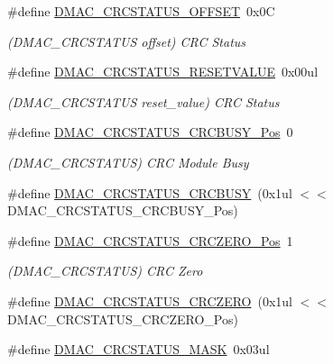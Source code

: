 \begin{DoxyCompactItemize}
\#define \mbox{\hyperlink{group___s_a_m_d21___d_m_a_c_gab05e9410749f64351e0e0e5428cbd63e}{D\+M\+A\+C\+\_\+\+C\+R\+C\+S\+T\+A\+T\+U\+S\+\_\+\+O\+F\+F\+S\+ET}}~0x0C
\begin{DoxyCompactList}\small\item\em (D\+M\+A\+C\+\_\+\+C\+R\+C\+S\+T\+A\+T\+US offset) C\+RC Status \end{DoxyCompactList}\item 
\#define \mbox{\hyperlink{group___s_a_m_d21___d_m_a_c_gaa0c9009f518f6ae4a37ebe42ffc30007}{D\+M\+A\+C\+\_\+\+C\+R\+C\+S\+T\+A\+T\+U\+S\+\_\+\+R\+E\+S\+E\+T\+V\+A\+L\+UE}}~0x00ul
\begin{DoxyCompactList}\small\item\em (D\+M\+A\+C\+\_\+\+C\+R\+C\+S\+T\+A\+T\+US reset\+\_\+value) C\+RC Status \end{DoxyCompactList}\item 
\#define \mbox{\hyperlink{group___s_a_m_d21___d_m_a_c_gae6bb7fca62508d8dd9b0b0ad51ca6503}{D\+M\+A\+C\+\_\+\+C\+R\+C\+S\+T\+A\+T\+U\+S\+\_\+\+C\+R\+C\+B\+U\+S\+Y\+\_\+\+Pos}}~0
\begin{DoxyCompactList}\small\item\em (D\+M\+A\+C\+\_\+\+C\+R\+C\+S\+T\+A\+T\+US) C\+RC Module Busy \end{DoxyCompactList}\item 
\#define \mbox{\hyperlink{group___s_a_m_d21___d_m_a_c_gaf93b4ba437e8219c5b5ee859e20607ed}{D\+M\+A\+C\+\_\+\+C\+R\+C\+S\+T\+A\+T\+U\+S\+\_\+\+C\+R\+C\+B\+U\+SY}}~(0x1ul $<$$<$ D\+M\+A\+C\+\_\+\+C\+R\+C\+S\+T\+A\+T\+U\+S\+\_\+\+C\+R\+C\+B\+U\+S\+Y\+\_\+\+Pos)
\item 
\#define \mbox{\hyperlink{group___s_a_m_d21___d_m_a_c_ga82828623d891f8488dd3afc780ec46fd}{D\+M\+A\+C\+\_\+\+C\+R\+C\+S\+T\+A\+T\+U\+S\+\_\+\+C\+R\+C\+Z\+E\+R\+O\+\_\+\+Pos}}~1
\begin{DoxyCompactList}\small\item\em (D\+M\+A\+C\+\_\+\+C\+R\+C\+S\+T\+A\+T\+US) C\+RC Zero \end{DoxyCompactList}\item 
\#define \mbox{\hyperlink{group___s_a_m_d21___d_m_a_c_gabcda07f7f0242bf4225159bce302b804}{D\+M\+A\+C\+\_\+\+C\+R\+C\+S\+T\+A\+T\+U\+S\+\_\+\+C\+R\+C\+Z\+E\+RO}}~(0x1ul $<$$<$ D\+M\+A\+C\+\_\+\+C\+R\+C\+S\+T\+A\+T\+U\+S\+\_\+\+C\+R\+C\+Z\+E\+R\+O\+\_\+\+Pos)
\item 
\#define \mbox{\hyperlink{group___s_a_m_d21___d_m_a_c_gad4ddc72d73a4566323014d93fce2f081}{D\+M\+A\+C\+\_\+\+C\+R\+C\+S\+T\+A\+T\+U\+S\+\_\+\+M\+A\+SK}}~0x03ul

\end{DoxyCompactItemize}
